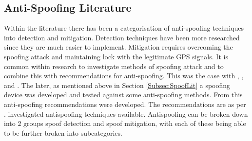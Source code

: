 %
%

\subsection{Anti-Spoofing Literature}
Within the literature there has been a categorisation of anti-spoofing techniques into detection and mitigation. Detection techniques have been more researched since they
are much easier to implement. Mitigation requires overcoming the spoofing attack and maintaining lock with the legitimate GPS signals. It is common within research to
investigate methods of spoofing attack and to combine this with recommendations for anti-spoofing. This was the case with \textcite{RN6}, \textcite{RN32},
\textcite{RN33} and \textcite{RN23}. The later, as mentioned above in Section \ref{Subsec:SpoofLit} a spoofing device was developed and tested against some anti-spoofing
methods. From this anti-spoofing recommendations were developed. The recommendations are as per \citeauthor{RN6}. \textcite{RN6} investigated antispoofing techniques
available. Antispoofing can be broken down into 2 groups spoof detection and spoof mitigation, with each of these being able to be further broken into subcategories. 

